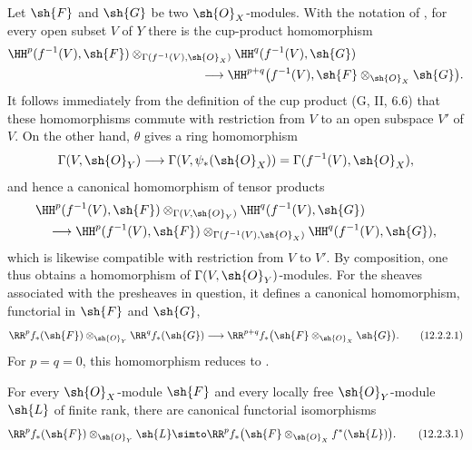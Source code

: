 \begin{env}[12.2.2]
\label{0.12.2.2}
Let $\sh{F}$ and $\sh{G}$ be two $\sh{O}_X$-modules.
With the notation of , for every open subset $V$ of
$Y$ there is the cup-product homomorphism 
\[
  \begin{aligned}
  &\HH^p(f^{-1}(V),\sh{F})
    \otimes_{\Gamma(f^{-1}(V),\sh{O}_X)}
    \HH^q(f^{-1}(V),\sh{G})\\
  &\hspace{55mm}\longrightarrow
    \HH^{p+q}\bigl(f^{-1}(V),
      \sh{F}\otimes_{\sh{O}_X}\sh{G}\bigr).
  \end{aligned}
\]
It follows immediately from the definition of the cup product
(G, II, 6.6) that these homomorphisms commute with restriction from
$V$ to an open subspace $V'$ of $V$.
On the other hand, $\theta$ gives a ring homomorphism
\[
  \Gamma(V,\sh{O}_Y)
  \longrightarrow\Gamma(V,\psi_*(\sh{O}_X))
  =\Gamma(f^{-1}(V),\sh{O}_X),
\]
and hence a canonical homomorphism of tensor products
\[
  \begin{aligned}
  &\HH^p(f^{-1}(V),\sh{F})
    \otimes_{\Gamma(V,\sh{O}_Y)}
    \HH^q(f^{-1}(V),\sh{G})\\
  &\quad\longrightarrow
    \HH^p(f^{-1}(V),\sh{F})
    \otimes_{\Gamma(f^{-1}(V),\sh{O}_X)}
    \HH^q(f^{-1}(V),\sh{G}),
  \end{aligned}
\]
which is likewise compatible with restriction from $V$ to $V'$.
By composition, one thus obtains a homomorphism of
$\Gamma(V,\sh{O}_Y)$-modules.  For the sheaves associated with the
presheaves in question, it defines a canonical homomorphism,
functorial in $\sh{F}$ and $\sh{G}$,
\[
  \RR^p f_*(\sh{F})\otimes_{\sh{O}_Y}\RR^q f_*(\sh{G})
  \longrightarrow
  \RR^{p+q}f_*
    \bigl(\sh{F}\otimes_{\sh{O}_X}\sh{G}\bigr).
  \tag{12.2.2.1}
  \label{0.12.2.2.1}
\]
For $p=q=0$, this homomorphism reduces to
.
\end{env}

\begin{proposition}[12.2.3]
\label{0.12.2.3}
For every $\sh{O}_X$-module $\sh{F}$ and every locally free
$\sh{O}_Y$-module $\sh{L}$ of finite rank, there are canonical
functorial isomorphisms
\[
  \RR^p f_*(\sh{F})\otimes_{\sh{O}_Y}\sh{L}
  \simto
  \RR^p f_*
    \bigl(\sh{F}\otimes_{\sh{O}_X}f^*(\sh{L})\bigr).
  \tag{12.2.3.1}
  \label{0.12.2.3.1}
\]
\end{proposition}

